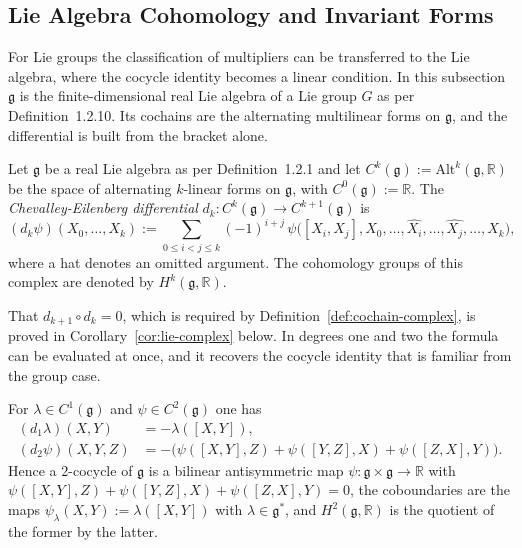 \subsection{Lie Algebra Cohomology and Invariant Forms}\label{subsec:lie-cohomology}

For Lie groups the classification of multipliers can be transferred to the Lie algebra, where the cocycle identity becomes a linear condition. In this subsection $\mathfrak{g}$ is the finite-dimensional real Lie algebra of a Lie group $G$ as per Definition~1.2.10. Its cochains are the alternating multilinear forms on $\mathfrak{g}$, and the differential is built from the bracket alone.

\begin{definition}\label{def:lie-cohomology-group}
	Let $\mathfrak{g}$ be a real Lie algebra as per Definition~1.2.1 and let $C^k(\mathfrak{g}):=\mathrm{Alt}^k(\mathfrak{g},\mathbb{R})$ be the space of alternating $k$-linear forms on $\mathfrak{g}$, with $C^0(\mathfrak{g}):=\mathbb{R}$. The \emph{Chevalley-Eilenberg differential} $d_k:C^k(\mathfrak{g})\to C^{k+1}(\mathfrak{g})$ is
	\begin{equation*}
		(d_k\psi)(X_0,\dots,X_k):=\sum_{0\leq i<j\leq k}(-1)^{i+j}\,\psi\big([X_i,X_j],X_0,\dots,\widehat{X_i},\dots,\widehat{X_j},\dots,X_k\big),
	\end{equation*}
	where a hat denotes an omitted argument. The cohomology groups of this complex are denoted by $H^k(\mathfrak{g},\mathbb{R})$.
\end{definition}

\noindent That $d_{k+1}\circ d_k=0$, which is required by Definition~\ref{def:cochain-complex}, is proved in Corollary~\ref{cor:lie-complex} below. In degrees one and two the formula can be evaluated at once, and it recovers the cocycle identity that is familiar from the group case.

\begin{proposition}\label{prop:lie-degree-two}
	For $\lambda\in C^1(\mathfrak{g})$ and $\psi\in C^2(\mathfrak{g})$ one has
	\begin{align*}
		(d_1\lambda)(X,Y)&=-\lambda([X,Y]),\\
		(d_2\psi)(X,Y,Z)&=-\big(\psi([X,Y],Z)+\psi([Y,Z],X)+\psi([Z,X],Y)\big).
	\end{align*}
	Hence a $2$-cocycle of $\mathfrak{g}$ is a bilinear antisymmetric map $\psi:\mathfrak{g}\times\mathfrak{g}\to\mathbb{R}$ with $\psi([X,Y],Z)+\psi([Y,Z],X)+\psi([Z,X],Y)=0$, the coboundaries are the maps $\psi_\lambda(X,Y):=\lambda([X,Y])$ with $\lambda\in\mathfrak{g}^*$, and $H^2(\mathfrak{g},\mathbb{R})$ is the quotient of the former by the latter.
\end{proposition}

